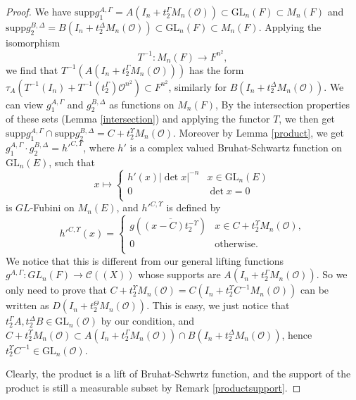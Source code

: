 \documentclass{amsart}
\theoremstyle{definition}
\theoremstyle{remark}
\numberwithin{equation}{section}
\def  \GL        {\mathrm{GL}}
\def  \supp     {\mathrm{supp}}
\def  \cC       {\mathcal{C}}
\def  \co       {\mathcal{O}}
\begin{document}
\begin{proof}
	  We have $\supp g_1^{A, \Gamma}= A(I_n+  t_2^{\Gamma} M_n(\co))\subset \GL_n(F) \subset M_n(F)$ and $\supp g_2^{B, \Delta}= B(I_n+  t_2^{\Delta} M_n(\co)) \subset \GL_n(F) \subset M_n(F)$.  Applying the isomorphism
	  $$
	  T^{-1}:  M_n(F)  \to F^{n^2},
	  $$
	   we find that $ T^{-1} (A(I_n+  t_2^{\Gamma} M_n(\co)))$  has the form $\tau_A(   T^{-1}(I_n)  +  T^{-1} (t_2^{\Gamma}) \co^{n^2})\subset F^{n^2}$, similarly for $B(I_n+  t_2^{\Delta} M_n(\co))$. We can view $g_1^{A, \Gamma}$ and $g_2^{B, \Delta}$ as functions on $M_n(F)$,  By the intersection properties of these sets (Lemma \ref{intersection}) and applying the functor  $T$, we then  get  $ \supp g_1^{A, \Gamma} \cap \supp g_2^{B, \Delta} = C+ t_2^{\Upsilon} M_n(\co)$.  Moreover  by Lemma \ref{product}, we get $g_1^{A, \Gamma} \cdot g_2^{B, \Delta} =h'^{ C,  \Upsilon} $,  where  $h'$ is a complex valued Bruhat-Schwartz function on $\GL_n(E)$, such that
	  $$
	   x \mapsto \left\{ 
	   \begin{array}{ll}
	   	h'(x) |\det x|^{-n}  &   x \in \GL_n(E) \\
	   	0          &    \det x  =0  \\
	   \end{array}
	   \right.
	   $$
	   is  $GL$-Fubini on $M_n(E)$,  and $h'^{ C,  \Upsilon} $ is defined by
	   $$
	   h'^{C, \Upsilon}(x) = \left\{
	   \begin{array}{ll}
	   	g\left(\overline{(x-C) t_2^{-\Upsilon}}\right)  &   x   \in  C+t_2^{\Upsilon} M_n(\co) , \\
	   	0   &  \text{otherwise}.  \\  
	   \end{array}
	   \right.
	   $$
	    We notice that this is different from our general  lifting functions $g^{A, \Gamma}: GL_n(F) \to \cC((X))$ whose supports are $A(I_n +t_2 ^{\Gamma}M_n(\co))$.   So we only need to prove that $C+t_2^{\Upsilon} M_n(\co)= C(I_n +t_2^{\Upsilon}C^{-1} M_n(\co) )$ can be written as $D(I_n +t_2^{\Theta}M_n(\co))$. This is easy, we just  notice that $t_2^{\Gamma}A,  t_2^{\Delta}B \in \GL_n(\co)$ by our condition,  and $C+t_2^{\Upsilon} M_n(\co) \subset A(I_n+t_2^{\Gamma} M_n(\co)) \cap B(I_n+t_2^{\Delta} M_n(\co))$,
	    hence $t_2^{\Upsilon}C^{-1} \in \GL_n(\co)$.
	    
	    Clearly, the product is a lift of Bruhat-Schwrtz function, and the support of the product is still a measurable subset by Remark \ref{productsupport}.
\end{proof}
\end{document}
